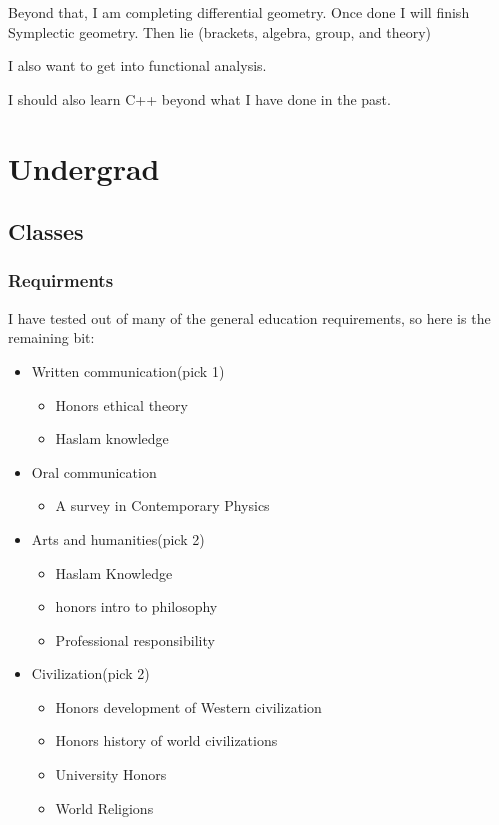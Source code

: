 Beyond that, I am completing differential geometry. Once done I will finish Symplectic geometry. Then lie (brackets, algebra, group, and theory)

I also want to get into functional analysis.

I should also learn C++ beyond what I have done in the past.
\section{Undergrad}
\subsection{Classes}
\subsubsection{Requirments}
I have tested out of many of the general education requirements, so here is the remaining bit:
\begin{itemize}
    \item Written communication(pick 1)
    \begin{itemize}
        \item Honors ethical theory
        \item Haslam knowledge
    \end{itemize}
    \item Oral communication
    \begin{itemize}
        \item A survey in Contemporary Physics
    \end{itemize}
    \item Arts and humanities(pick 2)
    \begin{itemize}
        \item Haslam Knowledge
        \item honors intro to philosophy
        \item Professional responsibility
    \end{itemize}
    \item Civilization(pick 2)
    \begin{itemize}
        \item Honors development of Western civilization
        \item Honors history of world civilizations
        \item University Honors
        \item World Religions
    \end{itemize}
\end{itemize}
